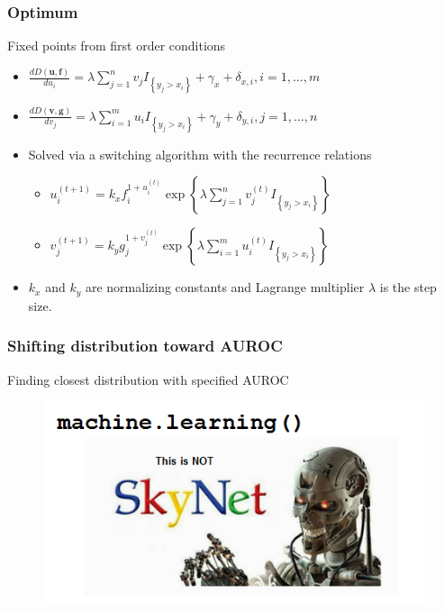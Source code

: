 \documentclass{beamer}
\begin{document}

\begin{frame}
\frametitle{Optimum}

Fixed points from first order conditions
\begin{itemize}
    \item $\frac{d D(\mathbf{u},\mathbf{f})}{d u_i} = \lambda \sum_{j = 1}^{n} v_j I_{\left\{ y_j > x_i \right\}} + \gamma_x + \delta_{x,i},
    i = 1, \dots, m$
    \item $\frac{d D(\mathbf{v},\mathbf{g})}{d v_j} = \lambda \sum_{i = 1}^{m} u_i I_{\left\{ y_j > x_i \right\}} + \gamma_y + \delta_{y,i},
    j = 1, \dots, n$
    \item Solved via a switching algorithm with the recurrence relations
    \begin{itemize}
        \item $u_i^{(t+1)} = k_x f_i ^{1 + u_i^{(t)}}
                \exp{ \left\{ \lambda \sum_{j = 1}^{n} v_j^{(t)} I_{\left\{ y_j > x_i \right\}} \right\} }$
        \item $v_j^{(t+1)} = k_y g_j ^{1 + v_j^{(t)}}
                \exp{ \left\{ \lambda \sum_{i = 1}^{m} u_i^{(t)} I_{\left\{ y_j > x_i \right\}}  \right\} }$
    \end{itemize}
    \item $k_x$ and $k_y$ are normalizing constants and Lagrange multiplier $\lambda$ is the step size.
\end{itemize}

\end{frame}


\begin{frame}
\frametitle{Shifting distribution toward AUROC}

Finding closest distribution with specified AUROC
\begin{figure}
    \includegraphics[scale =  0.75 ]{Figs/ThisIsNotSkyNetLogo.png}
\end{figure}

\end{frame}
\end{document}
